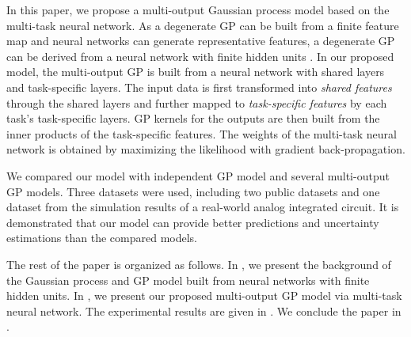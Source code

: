 In this paper, we propose a multi-output Gaussian process model based on the multi-task neural network. As a degenerate GP can be built from a finite feature map and neural networks can generate representative features, a degenerate GP can be derived from a neural network with finite hidden units \cite{lazaro2010marginalized, huang2015scalable}. In our proposed model, the multi-output GP is built from a neural network with shared layers and task-specific layers. The input data is first transformed into \emph{shared features} through the shared layers and further mapped to \emph{task-specific features} by each task's task-specific layers. GP kernels for the outputs are then built from the inner products of the task-specific features. The weights of the multi-task neural network is obtained by maximizing the likelihood with gradient back-propagation.

We compared our model with independent GP model and several multi-output GP models. Three datasets were used, including two public datasets and one dataset from the simulation results of a real-world analog integrated circuit. It is demonstrated that our model can provide better predictions and uncertainty estimations than the compared models.

The rest of the paper is organized as follows. In , we present the background of the Gaussian process and GP model built from neural networks with finite hidden units. In , we present our proposed multi-output GP model via multi-task neural network. The experimental results are given in . We conclude the paper in .


